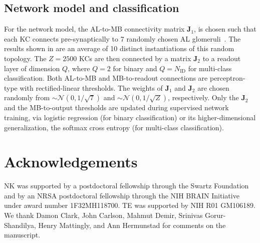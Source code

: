 \documentclass[9pt,lineno]{elife}
\begin{document}
\subsection{Network model and classification} 


For the network model, the AL-to-MB connectivity matrix $\mathbf {J}_1$, is chosen such that  each KC connects pre-synaptically to 7 randomly chosen AL glomeruli~\citep{litwinkumar,abbott_axel}. The results shown in  are an average of 10 distinct instantiations of this random topology. The $Z=2500$ KCs are then connected by a matrix $\mathbf J_2$ to a readout layer of dimension $Q$, where $Q=2$ for binary and $Q=N_{\text{ID}}$ for multi-class classification. Both AL-to-MB and MB-to-readout connections are perceptron-type with rectified-linear thresholds. The weights of $\mathbf J_1$ and $\mathbf J_2$ are chosen randomly from $\sim \mathcal{N}(0, 1/\sqrt{7})$ and $\sim \mathcal{N}(0, 1/\sqrt{Z})$, respectively. Only the $\mathbf J_2$ and the MB-to-output thresholds are updated during supervised network training, via logistic regression (for binary classification) or its higher-dimensional generalization, the softmax cross entropy (for multi-class classification).


\section{Acknowledgements}

NK was supported by a postdoctoral fellowship through the Swartz Foundation and by an NRSA postdoctoral fellowship through the NIH BRAIN Initiative under award number 1F32MH118700. TE was supported by NIH R01 GM106189. We thank Damon  Clark, John Carlson, Mahmut Demir, Srinivas Gorur-Shandilya, Henry Mattingly, and Ann Hermunstad for comments on the manuscript. 







\end{document}
